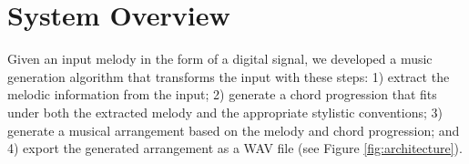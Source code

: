 \section{System Overview}

Given an input melody in the form of a digital signal, we developed a music generation algorithm that transforms the input with these steps: 1) extract the melodic information from the input; 2) generate a chord progression that fits under both the extracted melody and the appropriate stylistic conventions; 3) generate a musical arrangement based on the melody and chord progression; and 4) export the generated arrangement as a WAV file (see Figure \ref{fig:architecture}).








